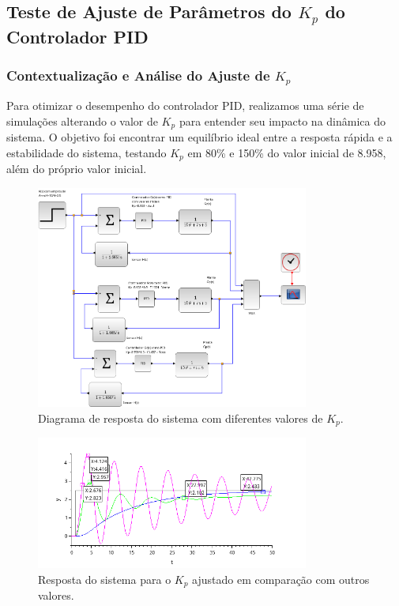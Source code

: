 \subsection{Teste de Ajuste de Parâmetros do \( K_p \) do Controlador PID}

\subsubsection{Contextualização e Análise do Ajuste de \( K_p \)}
Para otimizar o desempenho do controlador PID, realizamos uma série de simulações alterando o valor de \( K_p \) para entender seu impacto na dinâmica do sistema. O objetivo foi encontrar um equilíbrio ideal entre a resposta rápida e a estabilidade do sistema, testando \( K_p \) em 80\% e 150\% do valor inicial de 8.958, além do próprio valor inicial.

\begin{figure}[H]
    \centering
    \includegraphics[width=0.8\textwidth]{atividades/6-atividade/assets/c/diagrama-pid-ajustando-kp.png}
    \caption{Diagrama de resposta do sistema com diferentes valores de \( K_p \).}
    \label{fig:diagrama-comparacao-proporcional-pid}
\end{figure}

\begin{figure}[H]
    \centering
    \includegraphics[width=0.8\textwidth]{atividades/6-atividade/assets/c/pid-ajustando-kp.png}
    \caption{Resposta do sistema para o \( K_p \) ajustado em comparação com outros valores.}
    \label{fig:comparacao-proporcional-pid}
\end{figure}

